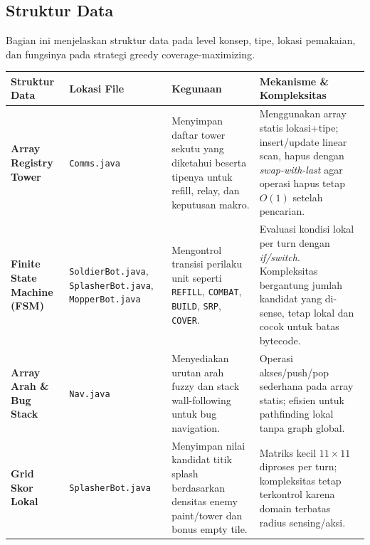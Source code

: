 \newpage
\subsection{Struktur Data}

Bagian ini menjelaskan struktur data pada level konsep, tipe, lokasi pemakaian, dan fungsinya pada strategi greedy coverage-maximizing.
\begin{table}[htbp]
	\centering
	\renewcommand{\arraystretch}{1.5}
	\begin{tabular}{|p{3.5cm}|p{3.5cm}|p{4cm}|p{4cm}|}
		\hline
		\textbf{Struktur Data}              & \textbf{Lokasi File}                                                         & \textbf{Kegunaan}                                                                                                         & \textbf{Mekanisme \& Kompleksitas}                                                                                                                            \\
		\hline
		\textbf{Array Registry Tower}       & \texttt{Comms.java}                                                          & Menyimpan daftar tower sekutu yang diketahui beserta tipenya untuk refill, relay, dan keputusan makro.                    & Menggunakan array statis lokasi+tipe; insert/update linear scan, hapus dengan \textit{swap-with-last} agar operasi hapus tetap $O(1)$ setelah pencarian.      \\
		\hline
		\textbf{Finite State Machine (FSM)} & \texttt{SoldierBot.java}, \texttt{SplasherBot.java}, \texttt{MopperBot.java} & Mengontrol transisi perilaku unit seperti \texttt{REFILL}, \texttt{COMBAT}, \texttt{BUILD}, \texttt{SRP}, \texttt{COVER}. & Evaluasi kondisi lokal per turn dengan \textit{if/switch}. Kompleksitas bergantung jumlah kandidat yang di-sense, tetap lokal dan cocok untuk batas bytecode. \\
		\hline
		\textbf{Array Arah \& Bug Stack}    & \texttt{Nav.java}                                                            & Menyediakan urutan arah fuzzy dan stack wall-following untuk bug navigation.                                              & Operasi akses/push/pop sederhana pada array statis; efisien untuk pathfinding lokal tanpa graph global.                                                       \\
		\hline
		\textbf{Grid Skor Lokal}            & \texttt{SplasherBot.java}                                                    & Menyimpan nilai kandidat titik splash berdasarkan densitas enemy paint/tower dan bonus empty tile.                        & Matriks kecil $11\times11$ diproses per turn; kompleksitas tetap terkontrol karena domain terbatas radius sensing/aksi.                                       \\

\end{tabular}
\end{table}
